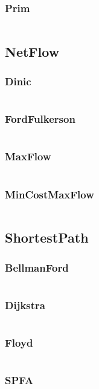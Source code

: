 \documentclass[a4paper,11pt]{article}
\begin{document}
\subsubsection{Prim}
\inputminted[breaklines]{c++}{GraphTheory/+MinimumSpanningTree/+Prim.cpp}

\subsection{NetFlow}
\subsubsection{Dinic}
\inputminted[breaklines]{c++}{GraphTheory/+NetFlow/+Dinic.cpp}
\subsubsection{FordFulkerson}
\inputminted[breaklines]{c++}{GraphTheory/+NetFlow/+FordFulkerson.cpp}
\subsubsection{MaxFlow}
\inputminted[breaklines]{c++}{GraphTheory/+NetFlow/+MaxFlow.cpp}
\subsubsection{MinCostMaxFlow}
\inputminted[breaklines]{c++}{GraphTheory/+NetFlow/+MinCostMaxFlow.cpp}

\subsection{ShortestPath}
\subsubsection{BellmanFord}
\inputminted[breaklines]{c++}{GraphTheory/+ShortestPath/+BellmanFord.cpp}
\subsubsection{Dijkstra}
\inputminted[breaklines]{c++}{GraphTheory/+ShortestPath/+Dijkstra.cpp}
\subsubsection{Floyd}
\inputminted[breaklines]{c++}{GraphTheory/+ShortestPath/+Floyd.cpp}
\subsubsection{SPFA}
\inputminted[breaklines]{c++}{GraphTheory/+ShortestPath/+SPFA.cpp}
\end{document}
